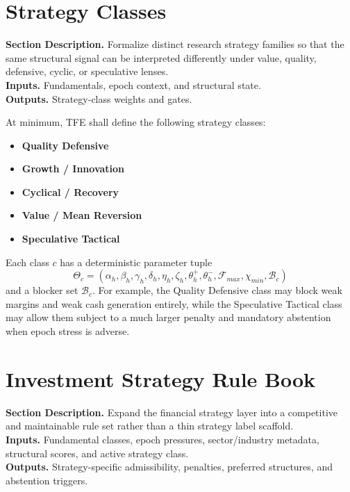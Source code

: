 \documentclass[11pt]{report}
\newcommand{\meta}[3]{\textbf{Section Description.} #1\\
\textbf{Inputs.} #2\\
\textbf{Outputs.} #3\par}
\begin{document}
\section{Strategy Classes}
\meta{Formalize distinct research strategy families so that the same structural signal can be interpreted differently under value, quality, defensive, cyclic, or speculative lenses.}{Fundamentals, epoch context, and structural state.}{Strategy-class weights and gates.}

At minimum, TFE shall define the following strategy classes:
\begin{itemize}
\item \textbf{Quality Defensive}
\item \textbf{Growth / Innovation}
\item \textbf{Cyclical / Recovery}
\item \textbf{Value / Mean Reversion}
\item \textbf{Speculative Tactical}
\end{itemize}

Each class $c$ has a deterministic parameter tuple
\[
\Theta_c=(\alpha_h,\beta_h,\gamma_h,\delta_h,\eta_h,\zeta_h,\theta_h^+,\theta_h^-,\mathcal{F}_{max},\chi_{min},\mathcal{B}_c)
\]
and a blocker set $\mathcal{B}_c$. For example, the Quality Defensive class may block weak margins and weak cash generation entirely, while the Speculative Tactical class may allow them subject to a much larger penalty and mandatory abstention when epoch stress is adverse.


\section{Investment Strategy Rule Book}
\meta{Expand the financial strategy layer into a competitive and maintainable rule set rather than a thin strategy label scaffold.}{Fundamental classes, epoch pressures, sector/industry metadata, structural scores, and active strategy class.}{Strategy-specific admissibility, penalties, preferred structures, and abstention triggers.}
\end{document}
